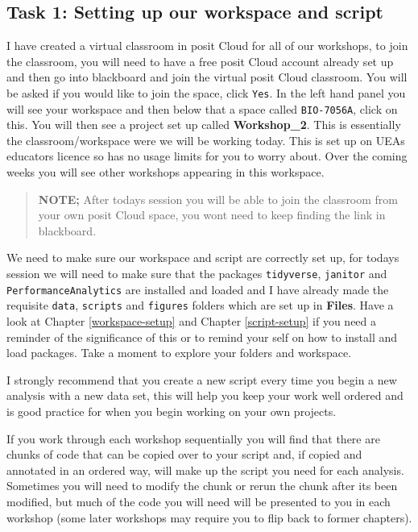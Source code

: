 \documentclass[
]{book}
\begin{document}
\subsection{Task 1: Setting up our workspace and script}\label{task-1-setting-up-our-workspace-and-script}

I have created a virtual classroom in posit Cloud for all of our workshops, to join the classroom, you will need to have a free posit Cloud account already set up and then go into blackboard and join the virtual posit Cloud classroom. You will be asked if you would like to join the space, click \texttt{Yes}. In the left hand panel you will see your workspace and then below that a space called \texttt{BIO-7056A}, click on this. You will then see a project set up called \textbf{Workshop\_2}. This is essentially the classroom/workspace were we will be working today. This is set up on UEAs educators licence so has no usage limits for you to worry about. Over the coming weeks you will see other workshops appearing in this workspace.

\begin{quote}
\textbf{NOTE;} After todays session you will be able to join the classroom from your own posit Cloud space, you wont need to keep finding the link in blackboard.
\end{quote}

We need to make sure our workspace and script are correctly set up, for todays session we will need to make sure that the packages \texttt{tidyverse}, \texttt{janitor} and \texttt{PerformanceAnalytics} are installed and loaded and I have already made the requisite \texttt{data}, \texttt{scripts} and \texttt{figures} folders which are set up in \textbf{Files}. Have a look at Chapter \ref{workspace-setup} and Chapter \ref{script-setup} if you need a reminder of the significance of this or to remind your self on how to install and load packages. Take a moment to explore your folders and workspace.

I strongly recommend that you create a new script every time you begin a new analysis with a new data set, this will help you keep your work well ordered and is good practice for when you begin working on your own projects.

If you work through each workshop sequentially you will find that there are chunks of code that can be copied over to your script and, if copied and annotated in an ordered way, will make up the script you need for each analysis. Sometimes you will need to modify the chunk or rerun the chunk after its been modified, but much of the code you will need will be presented to you in each workshop (some later workshops may require you to flip back to former chapters).
\end{document}
